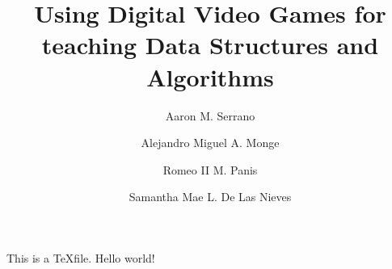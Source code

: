 \documentclass{article}
\title{Using Digital Video Games for teaching Data Structures and Algorithms}
\author{Aaron M. Serrano}
\author{Alejandro Miguel A. Monge}
\author{Romeo II M. Panis}
\author{Samantha Mae L. De Las Nieves}
\begin{document}
    This is a \TeX file.
    Hello world!
\end{document}
